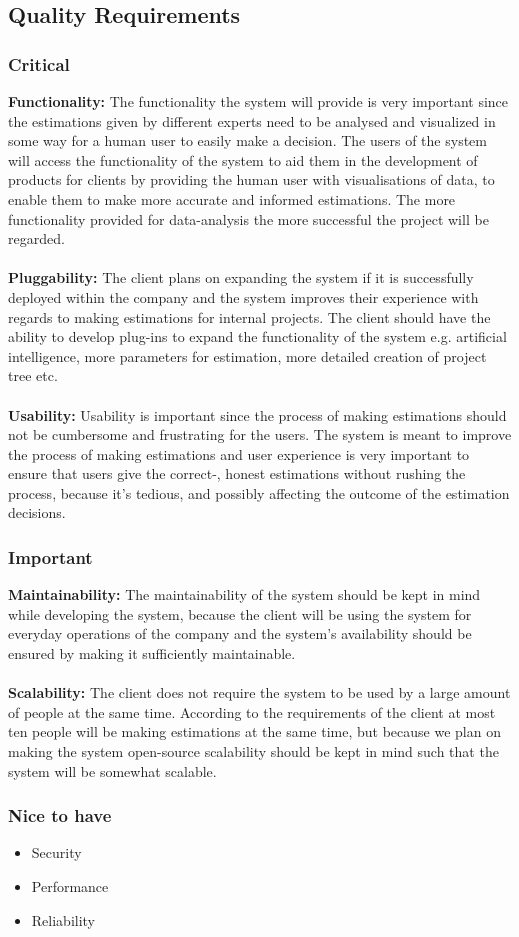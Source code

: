 \subsection{Quality Requirements}
\subsubsection{Critical}
{\bfseries Functionality:} The functionality the system will provide is very important since the estimations given by different experts need to be analysed and visualized in some way for a human user to easily make a decision. The users of the system will access the functionality of the system to aid them in the development of products for clients by providing the human user with visualisations of data, to enable them to make more accurate and informed estimations. The more functionality provided for data-analysis the more successful the project will be regarded.
\\ \\
{\bfseries Pluggability:} The client plans on expanding the system if it is successfully deployed within the company and the system improves their experience with regards to making estimations for internal projects. The client should have the ability to develop plug-ins to expand the functionality of the system e.g. artificial intelligence, more parameters for estimation, more detailed creation of project tree etc.
\\ \\
{\bfseries Usability:} Usability is important since the process of making estimations should not be cumbersome and frustrating for the users. The system is meant to improve the process of making estimations and user experience is very important to ensure that users give the correct-, honest estimations without rushing the process, because it's tedious, and possibly affecting the outcome of the estimation decisions.

\subsubsection{Important}
{\bfseries Maintainability:} The maintainability of the system should be kept in mind while developing the system, because the client will be using the system for everyday operations of the company and the system's availability should be ensured by making it sufficiently maintainable.
\\ \\
{\bfseries Scalability:} The client does not require the system to be used by a large amount of people at the same time. According to the requirements of the client at most ten people will be making estimations at the same time, but because we plan on making the system open-source scalability should be kept in mind such that the system will be somewhat scalable.

\subsubsection{Nice to have}
\begin{itemize}
	\item{Security}
	\item{Performance}
	\item{Reliability}
\end{itemize}
